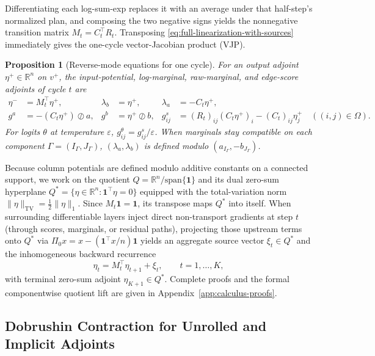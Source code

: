 \documentclass[10pt]{article}
\newtheorem{proposition}{Proposition}
\newcommand{\one}{\mathbf{1}}
\newcommand{\TV}{\mathrm{TV}}
\begin{document}
Differentiating each log-sum-exp replaces it with an average under that half-step's normalized plan, and composing the two negative signs yields the nonnegative transition matrix $M_t = C_t^\top R_t$. Transposing \eqref{eq:full-linearization-with-sources} immediately gives the one-cycle vector-Jacobian product (VJP).

\begin{proposition}[Reverse-mode equations for one cycle]
\label{prop:reverse-mode-cycle}
For an output adjoint $\eta^+ \in \mathbb{R}^n$ on $v^+$, the input-potential, log-marginal, raw-marginal, and edge-score adjoints of cycle $t$ are
\begin{align}
  \eta^- &= M_t^\top \eta^+, &
  \lambda_b &= \eta^+, &
  \lambda_a &= -C_t \eta^+, \label{eq:source-log-marginal-adjoints}\\
  g^a &= -(C_t \eta^+) \oslash a, &
  g^b &= \eta^+ \oslash b, &
  g^s_{ij} &= (R_t)_{ij}(C_t \eta^+)_i - (C_t)_{ij}\eta^+_j \quad ((i,j)\in\Omega). \label{eq:score-source-adjoint}
\end{align}
For logits $\theta$ at temperature $\varepsilon$, $g^\theta_{ij} = g^s_{ij}/\varepsilon$. When marginals stay compatible on each component $\Gamma = (I_\Gamma, J_\Gamma)$, $(\lambda_a, \lambda_b)$ is defined modulo $(a_{I_\Gamma}, -b_{J_\Gamma})$.
\end{proposition}

Because column potentials are defined modulo additive constants on a connected support, we work on the quotient $Q = \mathbb{R}^n / \mathrm{span}\{\one\}$ and its dual zero-sum hyperplane $Q^* = \{\eta \in \mathbb{R}^n : \one^\top \eta = 0\}$ equipped with the total-variation norm $\|\eta\|_{\TV} = \frac{1}{2}\|\eta\|_1$. Since $M_t\one = \one$, its transpose maps $Q^*$ into itself. When surrounding differentiable layers inject direct non-transport gradients at step $t$ (through scores, marginals, or residual paths), projecting those upstream terms onto $Q^*$ via $\Pi_0 x = x - (\one^\top x / n)\one$ yields an aggregate source vector $\xi_t \in Q^*$ and the inhomogeneous backward recurrence
\begin{equation}
\label{eq:tail-recurrence}
  \eta_t = M_t^\top \eta_{t+1} + \xi_t, \qquad t = 1, \dots, K,
\end{equation}
with terminal zero-sum adjoint $\eta_{K+1} \in Q^*$. Complete proofs and the formal componentwise quotient lift are given in Appendix~\ref{app:calculus-proofs}.

\subsection{Dobrushin Contraction for Unrolled and Implicit Adjoints}
\end{document}
